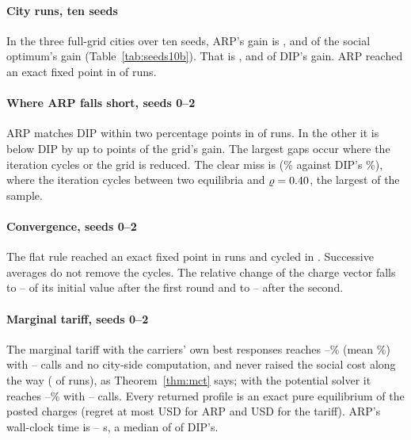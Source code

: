 \documentclass[preprint,11pt]{elsarticle}
\theoremstyle{definition}
\theoremstyle{remark}
\begin{document}
\paragraph{City runs, ten seeds} In the three full-grid cities over ten seeds, ARP's gain is \TenSoArpNewDelhi, \TenSoArpBuenosAires{} and \TenSoArpLondon{} of the social optimum's gain (Table~\ref{tab:seeds10b}). That is \TenArpDipNewDelhi, \TenArpDipBuenosAires{} and \TenArpDipLondon{} of DIP's gain. ARP reached an exact fixed point in \TenArpFixedN{} of \TenArpRuns{} runs.

\paragraph{Where ARP falls short, seeds 0--2} ARP matches DIP within two percentage points in \ArpEqualsDipN{} of \ArpRuns{} runs. In the other \ArpDipGapN{} it is below DIP by up to \ArpDipGapMax{} points of the grid's gain. The largest gaps occur where the iteration cycles or the grid is reduced. The clear miss is \ArpMissCase{} (\ArpMissGain\% against DIP's \ArpMissDip\%), where the iteration cycles between two equilibria and $\varrho=0.40$, the largest of the sample.

\paragraph{Convergence, seeds 0--2} The flat rule reached an exact fixed point in \ArpFixedN{} runs and cycled in \ArpCycleN. Successive averages do not remove the cycles. The relative change of the charge vector falls to \ArpStepAMin--\ArpStepAMax{} of its initial value after the first round and to \ArpStepBMin--\ArpStepBMax{} after the second.

\paragraph{Marginal tariff, seeds 0--2} The marginal tariff with the carriers' own best responses reaches \MctGainMin--\MctGainMax\% (mean \MctGainMean\%) with \MctCallsMin--\MctCallsMax{} calls and no city-side computation, and never raised the social cost along the way (\MctMonotoneN{} of \ArpRuns{} runs), as Theorem~\ref{thm:mct} says; with the potential solver it reaches \MctSoGainMin--\MctSoGainMax\% with \MctSoCallsMin--\MctSoCallsMax{} calls. Every returned profile is an exact pure equilibrium of the posted charges (regret at most \ArpRegretMax{} USD for ARP and \MctRegretMax{} USD for the tariff). ARP's wall-clock time is \ArpTimeMin--\ArpTimeMax{} s, a median of \ArpTimeRatioMed{} of DIP's.
\end{document}
